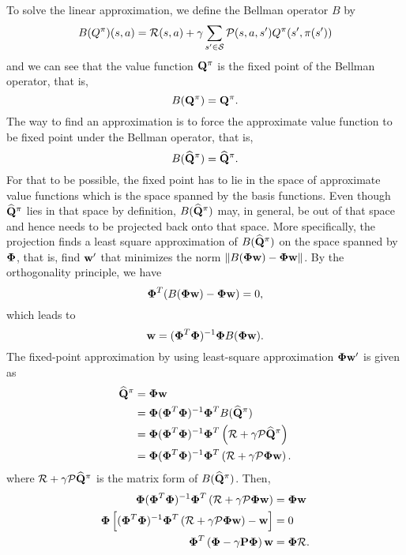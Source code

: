To solve the linear approximation, we define the Bellman operator $B$ by
\begin{equation}
    B(Q^\pi)(s,a) = \mathcal{R}(s,a) + \gamma\sum_{s'\in\mathcal{S}}\mathcal{P}(s,a,s')Q^{\pi}(s',\pi(s'))
\end{equation}
and we can see that the value function ${\mathbf Q}^\pi$ is the fixed point of the Bellman operator, that is,
\begin{equation}
    B({\mathbf Q}^\pi) = {\mathbf Q}^\pi.
\end{equation}
The way to find an approximation is to force the approximate value function to be fixed point under the Bellman operator, that is,
\begin{equation}
    B(\widehat {{\mathbf Q}}^\pi) = \widehat {{\mathbf Q}}^\pi.
\end{equation}
For that to be possible, the fixed point has to lie in the space of approximate value functions which is the space spanned by the basis functions. Even though $\widehat {{\mathbf Q}}^\pi$ lies in that space by definition, $B(\widehat {{\mathbf Q}}^\pi)$ may, in general, be out of that space and hence needs to be projected back onto that space. More specifically, the projection finds a least square approximation of $B(\widehat {{\mathbf Q}}^\pi)$ on the space spanned by $\boldsymbol{\Phi}$, that is, find ${\mathbf w}'$ that minimizes the norm $\|B(\boldsymbol{\Phi}{\mathbf w}) - \boldsymbol{\Phi}{\mathbf w}\|$. By the orthogonality principle, we have
\begin{equation}
    \boldsymbol{\Phi}^T(B(\boldsymbol{\Phi}{\mathbf w}) - \boldsymbol{\Phi}{\mathbf w}) = 0,
\end{equation}
which leads to
\begin{equation}
    {\mathbf w} = (\boldsymbol{\Phi}^T\boldsymbol{\Phi})^{-1}\boldsymbol{\Phi} B(\boldsymbol{\Phi}{\mathbf w}).
\end{equation}
The fixed-point approximation by using least-square approximation $\boldsymbol{\Phi}{\mathbf w}'$ is given as
\begin{align}
    \widehat {{\mathbf Q}}^\pi &= \boldsymbol{\Phi}{\mathbf w} \label{eq: linear approx. 2}\\
                     &= \boldsymbol{\Phi}(\boldsymbol{\Phi}^T\boldsymbol{\Phi})^{-1}\boldsymbol{\Phi}^T B(\widehat {{\mathbf Q}}^\pi) \\
                     &= \boldsymbol{\Phi}(\boldsymbol{\Phi}^T\boldsymbol{\Phi})^{-1}\boldsymbol{\Phi}^T \left(\mathcal{R} + \gamma \mathcal{P} \widehat{{\mathbf Q}}^{\pi} \right) \\
                     &= \boldsymbol{\Phi}(\boldsymbol{\Phi}^T\boldsymbol{\Phi})^{-1}\boldsymbol{\Phi}^T \left(\mathcal{R} + \gamma \mathcal{P} \boldsymbol{\Phi}{\mathbf w} \right). \label{eq: linear approx. 1}
\end{align}
where $\mathcal{R} + \gamma \mathcal{P} \widehat{{\mathbf Q}}^{\pi}$ is the matrix form of $B(\widehat {{\mathbf Q}}^\pi)$. Then,
\begin{align}
    \boldsymbol{\Phi}(\boldsymbol{\Phi}^T\boldsymbol{\Phi})^{-1}\boldsymbol{\Phi}^T \left(\mathcal{R} + \gamma \mathcal{P} \boldsymbol{\Phi}{\mathbf w} \right) &= \boldsymbol{\Phi}{\mathbf w} \\
    \boldsymbol{\Phi}\left[(\boldsymbol{\Phi}^T\boldsymbol{\Phi})^{-1}\boldsymbol{\Phi}^T \left(\mathcal{R} + \gamma \mathcal{P} \boldsymbol{\Phi}{\mathbf w} \right)-{\mathbf w}\right] &= 0 \\
    \boldsymbol{\Phi}^T\left(\boldsymbol{\Phi}-\gamma{\mathbf P}\boldsymbol{\Phi}\right){\mathbf w} &= \boldsymbol{\Phi}\mathcal{R}.
\end{align}
